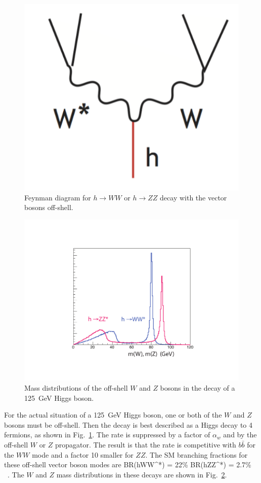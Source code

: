 \documentclass[12pt]{article}
\begin{document}
\begin{figure}
\begin{center}
\includegraphics[width=0.30\hsize]{HiggsWW.pdf}
\end{center}
\caption{Feynman diagram for $h\to WW$ or $h\to ZZ$ decay with the
  vector bosons off-shell.}
\label{fig:WWoff}
\end{figure}

\begin{figure}
\begin{center}
\includegraphics[width=0.70\hsize]{hWWmasses.pdf}
\end{center}
\caption{Mass distributions of the off-shell $W$ and $Z$ bosons in the
  decay of a 125~GeV Higgs boson.}
\label{fig:WWZZmass}
\end{figure}



For the actual situation of a 125~GeV Higgs boson, one or both of the
$W$ and $Z$ bosons must be off-shell.   Then the decay is best
described as a Higgs decay to 4 fermions, as shown in
Fig.~\ref{fig:WWoff}.
The rate is suppressed by a factor of $\alpha_w$ and by the off-shell
$W$ or $Z$ propagator.   The result is that the rate is competitive
with $b\bar b$ for the $WW$ mode and a factor 10 smaller for $ZZ$.
The SM branching fractions for these off-shell vector boson modes are
\beq
     BR(h\to WW^*) = 22\%  \qquad   BR(h\to ZZ^*) = 2.7\% \  .
\eeqn
The $W$ and $Z$ mass distributions in these decays are shown in
Fig.~\ref{fig:WWZZmass}.
\end{document}

